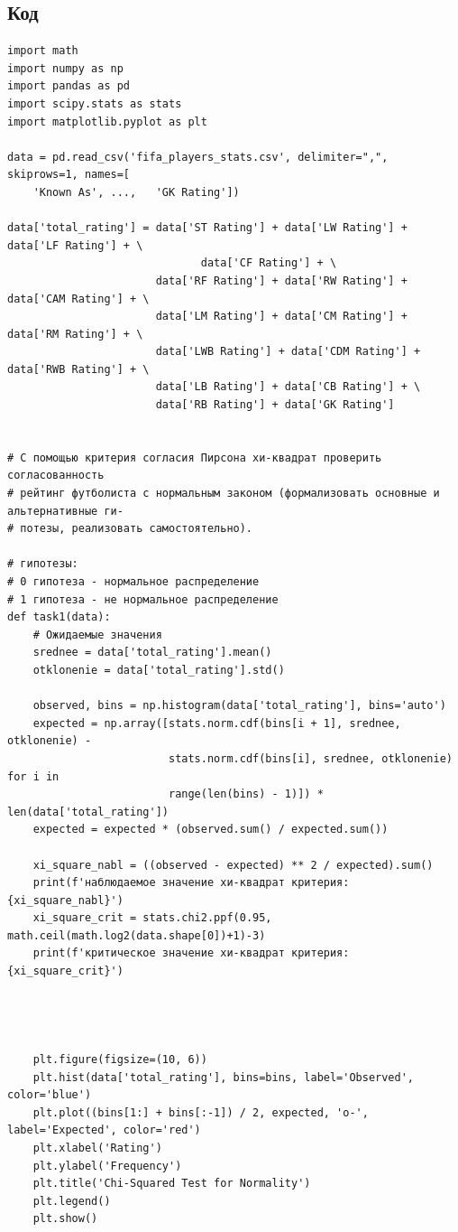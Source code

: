 \documentclass{article}
\begin{document}
\subsection{Код}
      \begin{verbatim}
import math
import numpy as np
import pandas as pd
import scipy.stats as stats
import matplotlib.pyplot as plt

data = pd.read_csv('fifa_players_stats.csv', delimiter=",", skiprows=1, names=[
    'Known As', ...,   'GK Rating'])

data['total_rating'] = data['ST Rating'] + data['LW Rating'] + data['LF Rating'] + \
                              data['CF Rating'] + \
                       data['RF Rating'] + data['RW Rating'] + data['CAM Rating'] + \
                       data['LM Rating'] + data['CM Rating'] + data['RM Rating'] + \
                       data['LWB Rating'] + data['CDM Rating'] + data['RWB Rating'] + \
                       data['LB Rating'] + data['CB Rating'] + \
                       data['RB Rating'] + data['GK Rating']


# С помощью критерия согласия Пирсона хи-квадрат проверить согласованность
# рейтинг футболиста с нормальным законом (формализовать основные и альтернативные ги-
# потезы, реализовать самостоятельно).

# гипотезы:
# 0 гипотеза - нормальное распределение
# 1 гипотеза - не нормальное распределение
def task1(data):
    # Ожидаемые значения
    srednee = data['total_rating'].mean()
    otklonenie = data['total_rating'].std()

    observed, bins = np.histogram(data['total_rating'], bins='auto')
    expected = np.array([stats.norm.cdf(bins[i + 1], srednee, otklonenie) -
                         stats.norm.cdf(bins[i], srednee, otklonenie) for i in
                         range(len(bins) - 1)]) * len(data['total_rating'])
    expected = expected * (observed.sum() / expected.sum())

    xi_square_nabl = ((observed - expected) ** 2 / expected).sum()
    print(f'наблюдаемое значение хи-квадрат критерия: {xi_square_nabl}')
    xi_square_crit = stats.chi2.ppf(0.95, math.ceil(math.log2(data.shape[0])+1)-3)
    print(f'критическое значение хи-квадрат критерия: {xi_square_crit}')




    plt.figure(figsize=(10, 6))
    plt.hist(data['total_rating'], bins=bins, label='Observed', color='blue')
    plt.plot((bins[1:] + bins[:-1]) / 2, expected, 'o-', label='Expected', color='red')
    plt.xlabel('Rating')
    plt.ylabel('Frequency')
    plt.title('Chi-Squared Test for Normality')
    plt.legend()
    plt.show()


\end{verbatim}
\end{document}
